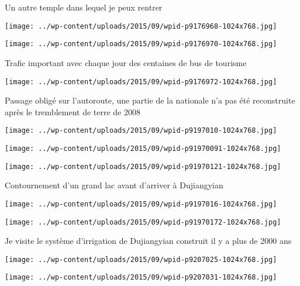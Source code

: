  \newline
 Un autre temple dans lequel je peux rentrer \newline
 \newline
\centerline{\texttt{[image: ../wp-content/uploads/2015/09/wpid-p9176968-1024x768.jpg]} } 
 \newline
 \newline
\centerline{\texttt{[image: ../wp-content/uploads/2015/09/wpid-p9176970-1024x768.jpg]} } 
 \newline
 Trafic important avec chaque jour des centaines de bus de tourisme \newline
 \newline
\centerline{\texttt{[image: ../wp-content/uploads/2015/09/wpid-p9176972-1024x768.jpg]} } 
 \newline
 Passage obligé sur l'autoroute, une partie de la nationale n'a pas été reconstruite après le tremblement de terre de 2008 \newline
 \newline
\centerline{\texttt{[image: ../wp-content/uploads/2015/09/wpid-p9197010-1024x768.jpg]} } 
 \newline
 \newline
\centerline{\texttt{[image: ../wp-content/uploads/2015/09/wpid-p91970091-1024x768.jpg]} } 
 \newline
 \newline
\centerline{\texttt{[image: ../wp-content/uploads/2015/09/wpid-p91970121-1024x768.jpg]} } 
 \newline
 Contournement d'un grand lac avant d'arriver à Dujiangyian \newline
 \newline
\centerline{\texttt{[image: ../wp-content/uploads/2015/09/wpid-p9197016-1024x768.jpg]} } 
 \newline
 \newline
\centerline{\texttt{[image: ../wp-content/uploads/2015/09/wpid-p91970172-1024x768.jpg]} } 
 \newline
 Je visite le système d'irrigation de Dujiangyian construit il y a plus de 2000 ans \newline
 \newline
\centerline{\texttt{[image: ../wp-content/uploads/2015/09/wpid-p9207025-1024x768.jpg]} } 
 \newline
 \newline
\centerline{\texttt{[image: ../wp-content/uploads/2015/09/wpid-p9207031-1024x768.jpg]} } 
